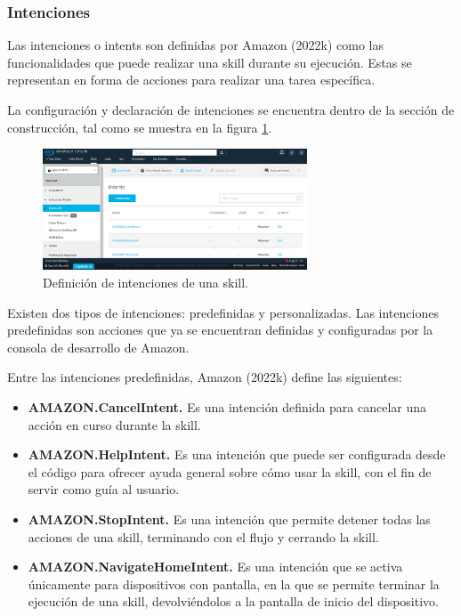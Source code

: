 
\subsubsection{Intenciones}
\label{IntencionescapIV}

Las intenciones o intents son definidas por Amazon (2022k) como las funcionalidades que puede realizar una skill durante su ejecución. Estas se representan en forma de acciones para realizar una tarea específica.

La configuración y declaración de intenciones se encuentra dentro de la sección de construcción, tal como se muestra en la figura \ref{fig:46}.

\begin{figure}
  \centering
  \includegraphics[width=0.70\textwidth]{Cap4/Figuras/Intenciones.png}
  \caption{Definición de intenciones de una skill.}
  \label{fig:46}
\end{figure}

Existen dos tipos de intenciones: predefinidas y personalizadas. Las intenciones predefinidas son acciones que ya se encuentran definidas y configuradas por la consola de desarrollo de Amazon.

Entre las intenciones predefinidas, Amazon (2022k) define las siguientes:

\begin{itemize}
  \item \textbf{AMAZON.CancelIntent.} Es una intención definida para cancelar una acción en curso durante la skill.
  \item \textbf{AMAZON.HelpIntent.} Es una intención que puede ser configurada desde el código para ofrecer ayuda general sobre cómo usar la skill, con el fin de servir como guía al usuario.
  \item \textbf{AMAZON.StopIntent.} Es una intención que permite detener todas las acciones de una skill, terminando con el flujo y cerrando la skill.
  \item \textbf{AMAZON.NavigateHomeIntent.} Es una intención que se activa únicamente para dispositivos con pantalla, en la que se permite terminar la ejecución de una skill, devolviéndolos a la pantalla de inicio del dispositivo.
\end{itemize}

